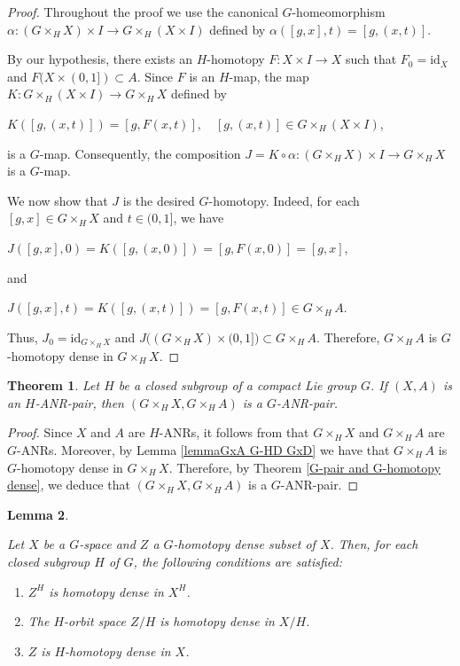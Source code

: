 \documentclass[12pt]{amsart}
\newtheorem{theorem}{Theorem}[section]
\newtheorem{lemma}[theorem]{Lemma}
\theoremstyle{definition}
\begin{document}
	\begin{proof}
		Throughout the proof we use the canonical $G$-homeomorphism $\alpha: (G\times_HX)\times I\rightarrow G\times_H(X\times I)$ defined by $\alpha([g,x],t)=[g,(x,t)]$.
		
		By our hypothesis, there exists an $H$-homotopy $F:X\times I\rightarrow X$ such that $F_0=\mbox{id}_X$ and $F(X\times (0,1])\subset A$. Since $F$ is an $H$-map, the map $K: G\times_H (X\times I)\rightarrow G\times_H X$ defined by 
		
		\begin{center}
			$K([g,(x,t)])=[g,F(x,t)],\quad [g,(x,t)]\in G\times_H(X\times I)$,
		\end{center}
		is a $G$-map. Consequently, the composition $J=K\circ \alpha: (G\times_HX)\times I\rightarrow G\times_HX$ is a $G$-map.
		
		We now show that $J$ is the desired $G$-homotopy. 
		Indeed, for each $[g,x] \in G \times_H X$ and $t \in (0,1]$, we have
		
		\begin{center}
			$J([g,x],0)=K([g,(x,0)])=[g,F(x,0)]=[g,x]$,
		\end{center}
		and
		\begin{center}
			$J([g,x],t)=K([g,(x,t)])=[g,F(x,t)]\in G\times_HA$.
		\end{center}
		Thus, $J_0=\mbox{id}_{G\times_HX}$ and $J\big((G\times_HX)\times (0,1]\big)\subset G\times_HA$. Therefore, $G\times_HA$ is $G$-homotopy dense in $G\times_HX$. 
	\end{proof}
	
	
	\begin{theorem}\label{GxA G-HD GxD}
		\rm{Let $H$ be a closed subgroup of a compact Lie group $G$. If $(X,A)$ is an $H$-ANR-pair, then $(G\times_HX,G\times_H A)$ is a $G$-ANR-pair.}
	\end{theorem}
	
	\begin{proof}
		Since $X$ and $A$ are $H$-ANRs, it follows from \cite[Proposition 3.1]{A4} that $G \times_H X$ and $G \times_H A$ are $G$-ANRs. Moreover, by Lemma \ref{lemmaGxA G-HD GxD} we have that $G \times_H A$ is $G$-homotopy dense in $G \times_H X$. Therefore, by Theorem \ref{G-pair and G-homotopy dense}, we deduce that $(G \times_H X, G \times_H A)$ is a $G$-ANR-pair.
	\end{proof}
	
	\begin{lemma}\label{lemmacondicionesGhomotopydense}
		\rm{Let $X$ be a $G$-space and $Z$ a $G$-homotopy dense subset of $X$. Then, for each closed subgroup $H$ of $G$, the following conditions are satisfied:
			
			\begin{enumerate}
				\item [(i)] $Z^H$ is homotopy dense in $X^H$.
				\item [(ii)] The $H$-orbit space $Z/H$ is homotopy dense in $X/H$.
				\item [(iii)] $Z$ is $H$-homotopy dense in $X$.
		\end{enumerate}}
	\end{lemma}
	
\end{document}
